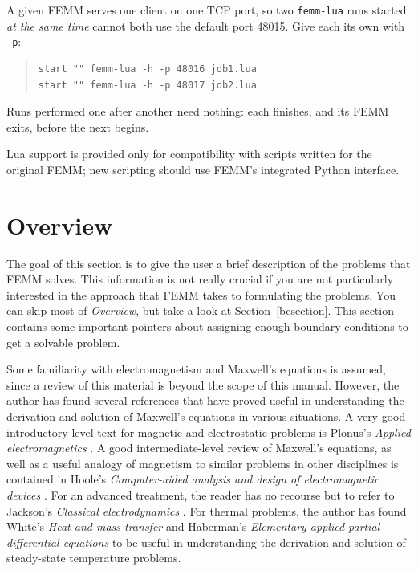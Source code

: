 \documentclass[12pt]{report}
\begin{document}
A given FEMM serves one client on one TCP port, so two {\tt femm-lua} runs
started \emph{at the same time} cannot both use the default port 48015.  Give
each its own with {\tt -p}:

\begin{quote}
\begin{verbatim}
start "" femm-lua -h -p 48016 job1.lua
start "" femm-lua -h -p 48017 job2.lua
\end{verbatim}
\end{quote}

\noindent Runs performed one after another need nothing: each finishes, and
its FEMM exits, before the next begins.

Lua support is provided only for compatibility with scripts written for the
original FEMM; new scripting should use FEMM's integrated Python interface.

\section{Overview}

The goal of this section is to give the user a brief description of
the problems that FEMM solves.  This information is not really
crucial if you are not particularly interested in the approach that
FEMM takes to formulating the problems.  You can skip most of {\em
Overview}, but take a look at Section~\ref{bcsection}.  This
section contains some important pointers about assigning enough
boundary conditions to get a solvable problem.

Some familiarity with electromagnetism and Maxwell's equations is
assumed, since a review of this material is beyond the scope of
this manual. However, the author has found several references that
have proved useful in understanding the derivation and solution of
Maxwell's equations in various situations.  A very good
introductory-level text for magnetic and electrostatic problems
is Plonus's {\em Applied electromagnetics}
\cite{Plonus}. A good intermediate-level review of Maxwell's
equations, as well as a useful analogy of magnetism to similar
problems in other disciplines is contained in Hoole's {\em
Computer-aided analysis and design of electromagnetic devices}
\cite{Hoole}.  For an advanced treatment, the reader has no
recourse but to refer to Jackson's {\em Classical electrodynamics}
\cite{Jackson}.  For thermal problems, the author has found
White's {\em Heat and mass transfer} \cite{FrankWhite} and 
Haberman's {\em Elementary applied partial differential equations}
\cite{Haberman} to be useful in understanding the derivation and solution of
steady-state temperature problems.  
\end{document}
